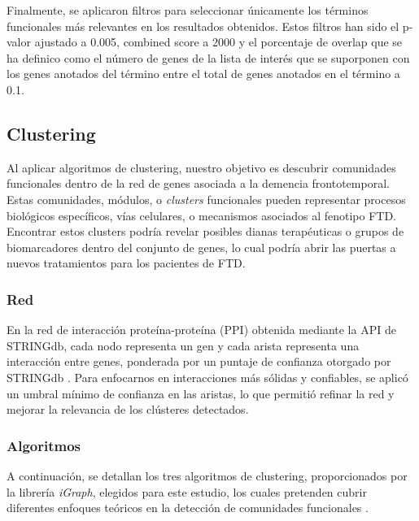 Finalmente, se aplicaron filtros para seleccionar únicamente los términos funcionales más relevantes en los resultados obtenidos. Estos filtros han sido el p-valor ajustado a  0.005,
combined score a  2000 y el porcentaje de overlap que se ha definico como  el número de genes de la lista de interés que se suporponen con los genes anotados del término entre el total de genes anotados en el término a 0.1.




\subsection{Clustering}

Al aplicar algoritmos de clustering, nuestro objetivo es descubrir comunidades funcionales dentro de la red de genes asociada a la demencia frontotemporal. Estas comunidades, módulos, o \textit{clusters} funcionales pueden representar procesos biológicos específicos, vías celulares, o mecanismos asociados al fenotipo FTD. Encontrar estos clusters podría revelar posibles dianas terapéuticas o grupos de biomarcadores dentro del conjunto de genes, lo cual podría abrir las puertas a nuevos tratamientos para los pacientes de FTD.

\subsubsection{Red}

En la red de interacción proteína-proteína (PPI) obtenida mediante la API de STRINGdb, cada nodo representa un gen y cada arista representa una interacción entre genes, ponderada por un puntaje de confianza otorgado por STRINGdb \cite{szklarczyk2023stringdb}. Para enfocarnos en interacciones más sólidas y confiables, se aplicó un umbral mínimo de confianza en las aristas, lo que permitió refinar la red y mejorar la relevancia de los clústeres detectados. 


\subsubsection{Algoritmos}
\label{sec:algoritmos}

A continuación, se detallan los tres algoritmos de clustering, proporcionados por la librería \textit{iGraph}, elegidos para este estudio, los cuales pretenden cubrir diferentes enfoques teóricos en la detección de comunidades funcionales \cite{igraph}.  

